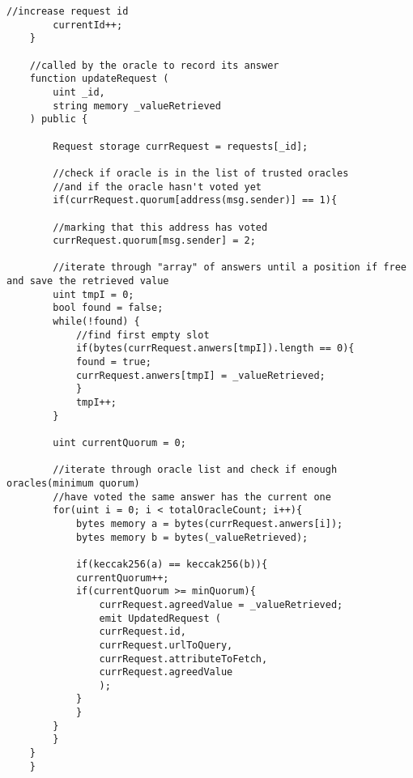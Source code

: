 \begin{lstlisting}[language=Solidity]
        //increase request id
        currentId++;
    }

    //called by the oracle to record its answer
    function updateRequest (
        uint _id,
        string memory _valueRetrieved
    ) public {

        Request storage currRequest = requests[_id];

        //check if oracle is in the list of trusted oracles
        //and if the oracle hasn't voted yet
        if(currRequest.quorum[address(msg.sender)] == 1){

        //marking that this address has voted
        currRequest.quorum[msg.sender] = 2;

        //iterate through "array" of answers until a position if free and save the retrieved value
        uint tmpI = 0;
        bool found = false;
        while(!found) {
            //find first empty slot
            if(bytes(currRequest.anwers[tmpI]).length == 0){
            found = true;
            currRequest.anwers[tmpI] = _valueRetrieved;
            }
            tmpI++;
        }

        uint currentQuorum = 0;

        //iterate through oracle list and check if enough oracles(minimum quorum)
        //have voted the same answer has the current one
        for(uint i = 0; i < totalOracleCount; i++){
            bytes memory a = bytes(currRequest.anwers[i]);
            bytes memory b = bytes(_valueRetrieved);

            if(keccak256(a) == keccak256(b)){
            currentQuorum++;
            if(currentQuorum >= minQuorum){
                currRequest.agreedValue = _valueRetrieved;
                emit UpdatedRequest (
                currRequest.id,
                currRequest.urlToQuery,
                currRequest.attributeToFetch,
                currRequest.agreedValue
                );
            }
            }
        }
        }
    }
    }


  \end{lstlisting}
